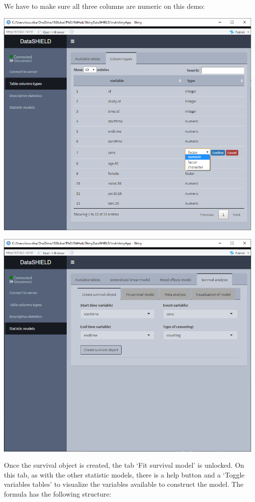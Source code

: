 \documentclass[
]{book}
\begin{document}
We have to make sure all three columns are numeric on this demo:

\includegraphics{images/survival2.png}

\includegraphics{images/survival3.png}

Once the survival object is created, the tab `Fit survival model' is unlocked. On this tab, as with the other statistic models, there is a help button and a `Toggle variables tables' to visualize the variables available to construct the model. The formula has the following structure:
\end{document}

